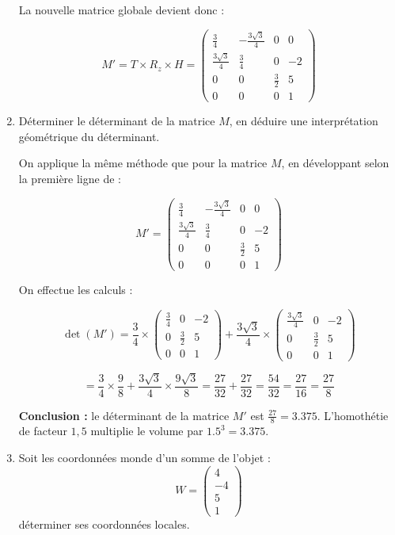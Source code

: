 \documentclass[a4paper,12pt]{article}
\begin{document}
\begin{enumerate}
  La nouvelle matrice globale devient donc :

  \begin{equation}
  M' = T \times R_z \times H
  = 
  \begin{pmatrix}
  \frac{3}{4} & -\frac{3\sqrt{3}}{4} & 0 & 0 \\
  \frac{3\sqrt{3}}{4} & \frac{3}{4} & 0 & -2 \\
  0 & 0 & \frac{3}{2} & 5 \\
  0 & 0 & 0 & 1
  \end{pmatrix}
  \end{equation}

  \item Déterminer le déterminant de la matrice $M$, en déduire une interprétation géométrique du déterminant.

On applique la même méthode que pour la matrice \(M\), en développant selon la première ligne de :

  \[
  M' = 
  \begin{pmatrix}
  \frac{3}{4} & -\frac{3\sqrt{3}}{4} & 0 & 0 \\
  \frac{3\sqrt{3}}{4} & \frac{3}{4} & 0 & -2 \\
  0 & 0 & \frac{3}{2} & 5 \\
  0 & 0 & 0 & 1
  \end{pmatrix}
  \]

  On effectue les calculs :

  \[
  \det(M') =
  \frac{3}{4} \times 
  \begin{pmatrix}
  \frac{3}{4} & 0 & -2 \\
  0 & \frac{3}{2} & 5 \\
  0 & 0 & 1
  \end{pmatrix}
  + \frac{3\sqrt{3}}{4} \times 
  \begin{pmatrix}
  \frac{3\sqrt{3}}{4} & 0 & -2 \\
  0 & \frac{3}{2} & 5 \\
  0 & 0 & 1
  \end{pmatrix}
  \]

  \[
  = \frac{3}{4} \times \frac{9}{8} + \frac{3\sqrt{3}}{4} \times \frac{9\sqrt{3}}{8}
  = \frac{27}{32} + \frac{27}{32} = \frac{54}{32} = \frac{27}{16} = \frac{27}{8}
  \]

  \textbf{Conclusion :} le déterminant de la matrice \(M'\) est \(\frac{27}{8} = 3.375\).  
  L’homothétie de facteur \(1{,}5\) multiplie le volume par \(1.5^3 = 3.375\).


  \item Soit les coordonnées monde d'un somme de l'objet :  
  \[
  W = \begin{pmatrix} 4 \\ -4 \\ 5 \\ 1 \end{pmatrix}
  \]
  déterminer ses coordonnées locales.
\end{enumerate}
\end{document}
